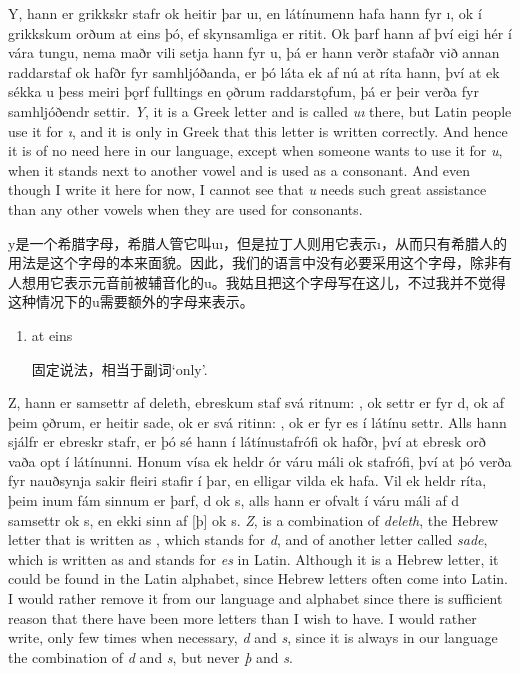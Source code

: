 \begin{paracol}{2}
    Y, hann er grikkskr stafr ok heitir þar uı, en látínumenn hafa hann fyr ı, ok í grikkskum orðum at eins þó, ef skynsamliga er ritit. Ok þarf hann af því eigi hér í vára tungu, nema maðr vili setja hann fyr u, þá er hann verðr stafaðr við annan raddarstaf ok hafðr fyr samhljóðanda, er þó láta ek af nú at ríta hann, því at ek sékka u þess meiri þǫrf fulltings en ǫðrum raddarstǫfum, þá er þeir verða fyr samhljóðendr settir.
    \switchcolumn
    \textit{Y}, it is a Greek letter and is called \textit{uı} there, but Latin people use it for \textit{ı}, and it is only in Greek that this letter is written correctly. And hence it is of no need here in our language, except when someone wants to use it for \textit{u}, when it stands next to another vowel and is used as a consonant. And even though I write it here for now, I cannot see that \textit{u} needs such great assistance than any other vowels when they are used for consonants.
\end{paracol}
\begin{translation*}{}
    y是一个希腊字母，希腊人管它叫uı，但是拉丁人则用它表示ı，从而只有希腊人的用法是这个字母的本来面貌。因此，我们的语言中没有必要采用这个字母，除非有人想用它表示元音前被辅音化的u。我姑且把这个字母写在这儿，不过我并不觉得这种情况下的u需要额外的字母来表示。
\end{translation*}
\begin{grammar*}{}
    \begin{enumerate}[leftmargin=*]
        \item at eins

              固定说法，相当于副词`only'.
    \end{enumerate}
\end{grammar*}
\begin{paracol}{2}
    Z, hann er samsettr af deleth, ebreskum staf svá ritnum: , ok settr er fyr d, ok af þeim ǫðrum, er heitir sade, ok er svá ritinn: , ok er fyr es í látínu settr. Alls hann sjálfr er ebreskr stafr, er þó sé hann í látínustafrófi ok hafðr, því at ebresk orð vaða opt í látínunni. Honum vísa ek heldr ór váru máli ok stafrófi, því at þó verða fyr nauðsynja sakir fleiri stafir í þar, en elligar vilda ek hafa. Vil ek heldr ríta, þeim inum fám sinnum er þarf, d ok s, alls hann er ofvalt í váru máli af d samsettr ok s, en ekki sinn af [þ] ok s.
    \switchcolumn
    \textit{Z}, is a combination of \textit{deleth}, the Hebrew letter that is written as , which stands for \textit{d}, and of another letter called \textit{sade}, which is written as  and stands for \textit{es} in Latin. Although it is a Hebrew letter, it could be found in the Latin alphabet, since Hebrew letters often come into Latin. I would rather remove it from our language and alphabet since there is sufficient reason that there have been more letters than I wish to have. I would rather write, only few times when necessary, \textit{d} and \textit{s}, since it is always in our language the combination of \textit{d} and \textit{s}, but never \textit{þ} and \textit{s}.
\end{paracol}
